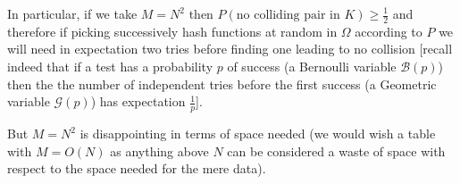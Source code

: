 \documentclass[12pt]{article}
\theoremstyle{plain}
\theoremstyle{remark}
\begin{document}
In particular, if we take $M = N^2$ then $P(\text{no colliding
pair in } K) \geq \frac12$ and therefore if picking successively hash 
functions at random in $\Omega$ according to $P$ we will need in 
expectation two tries before finding one leading to no collision 
[recall indeed that if a test has a probability $p$ of success (a Bernoulli variable $\mathcal{B}(p)$) then the
the number of independent tries before the first success (a Geometric variable
$\mathcal{G}(p)$) has expectation $\frac{1}{p}$].

\medskip

But $M = N^2$ is disappointing in terms of space needed (we would
wish a table with $M = O(N)$ as anything above $N$ can be considered 
a waste of space with respect to the space needed for the mere data). 

\medskip
\end{document}
